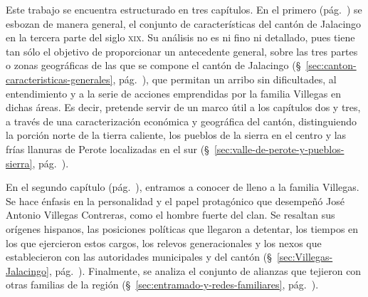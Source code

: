 \documentclass[14pt,twoside,final]{extbook} %
\begin{document}
Este trabajo se encuentra estructurado en tres capítulos. En el primero (pág.~\pageref{ch:capitulo-uno}) se esbozan de manera general, el conjunto de características del cantón de Jalacingo en la tercera parte del siglo \textsc{xix}. Su análisis no es ni fino ni detallado, pues tiene tan sólo el objetivo de proporcionar un antecedente general, sobre las tres partes o zonas geográficas de las que se compone el cantón de Jalacingo (\S~\ref{sec:canton-caracteristicas-generales}, pág.~\pageref{sec:canton-caracteristicas-generales}), que permitan un arribo sin dificultades, al entendimiento y a la serie de acciones emprendidas por la familia Villegas en dichas áreas. Es decir, pretende servir de un marco útil a los capítulos dos y tres, a través de una caracterización económica y geográfica del cantón, distinguiendo la porción norte de la tierra caliente, los pueblos de la sierra en el centro y las frías llanuras de Perote localizadas en el sur (\S~\ref{sec:valle-de-perote-y-pueblos-sierra}, pág.~\pageref{sec:valle-de-perote-y-pueblos-sierra}).

En el segundo capítulo (pág.~\pageref{ch:capitulo-dos}), entramos a conocer de lleno a la familia Villegas. Se hace énfasis en la personalidad y el papel protagónico que desempeñó José Antonio Villegas Contreras, como el hombre fuerte del clan. Se resaltan sus orígenes hispanos, las posiciones políticas que llegaron a detentar, los tiempos en los que ejercieron estos cargos, los relevos generacionales y los nexos que establecieron con las autoridades municipales y del cantón (\S~\ref{sec:Villegas-Jalacingo}, pág.~\pageref{sec:Villegas-Jalacingo}). Finalmente, se analiza el conjunto de alianzas que tejieron con otras familias de la región (\S~\ref{sec:entramado-y-redes-familiares}, pág.~\pageref{sec:entramado-y-redes-familiares}).
\end{document}
